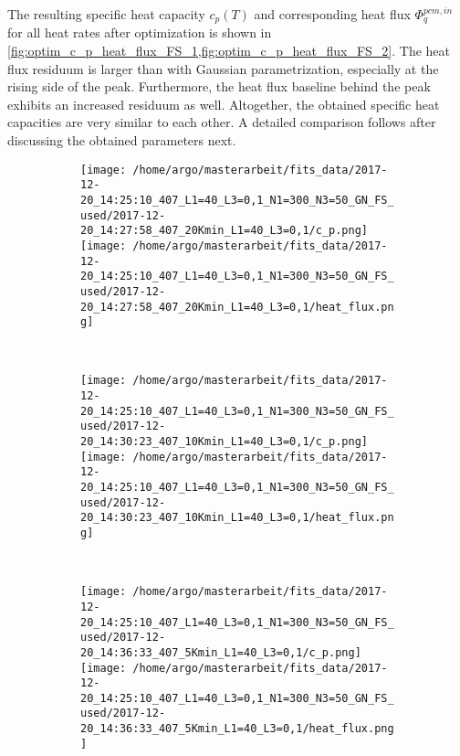 \documentclass{scrartcl}[12pt, halfparskip]
\numberwithin{equation}{section}
\numberwithin{figure}{section}
\numberwithin{table}{section}
\begin{document}
The resulting specific heat capacity $c_p(T)$ and corresponding heat flux $\varPhi_q^{pcm,in}$ for all heat rates after optimization is shown in \cref{fig:optim_c_p_heat_flux_FS_1,fig:optim_c_p_heat_flux_FS_2}. The heat flux residuum is larger than with Gaussian parametrization, especially at the rising side of the peak. Furthermore, the heat flux baseline behind the peak exhibits an increased residuum as well. Altogether, the obtained specific heat capacities are very similar to each other. A detailed comparison follows after discussing the obtained parameters next.



\begin{figure}[H]
	\begin{subfigure}{1.\textwidth}
		\texttt{[image: /home/argo/masterarbeit/fits\_data/2017-12-20\_14:25:10\_407\_L1=40\_L3=0,1\_N1=300\_N3=50\_GN\_FS\_used/2017-12-20\_14:27:58\_407\_20Kmin\_L1=40\_L3=0,1/c\_p.png]}
		\texttt{[image: /home/argo/masterarbeit/fits\_data/2017-12-20\_14:25:10\_407\_L1=40\_L3=0,1\_N1=300\_N3=50\_GN\_FS\_used/2017-12-20\_14:27:58\_407\_20Kmin\_L1=40\_L3=0,1/heat\_flux.png]}
	\end{subfigure} \\[1ex]
	
	\begin{subfigure}{1.\textwidth}
		\texttt{[image: /home/argo/masterarbeit/fits\_data/2017-12-20\_14:25:10\_407\_L1=40\_L3=0,1\_N1=300\_N3=50\_GN\_FS\_used/2017-12-20\_14:30:23\_407\_10Kmin\_L1=40\_L3=0,1/c\_p.png]}
		\texttt{[image: /home/argo/masterarbeit/fits\_data/2017-12-20\_14:25:10\_407\_L1=40\_L3=0,1\_N1=300\_N3=50\_GN\_FS\_used/2017-12-20\_14:30:23\_407\_10Kmin\_L1=40\_L3=0,1/heat\_flux.png]}
	\end{subfigure} \\[1ex]
	
	\begin{subfigure}{1.\textwidth}
		\texttt{[image: /home/argo/masterarbeit/fits\_data/2017-12-20\_14:25:10\_407\_L1=40\_L3=0,1\_N1=300\_N3=50\_GN\_FS\_used/2017-12-20\_14:36:33\_407\_5Kmin\_L1=40\_L3=0,1/c\_p.png]}
		\texttt{[image: /home/argo/masterarbeit/fits\_data/2017-12-20\_14:25:10\_407\_L1=40\_L3=0,1\_N1=300\_N3=50\_GN\_FS\_used/2017-12-20\_14:36:33\_407\_5Kmin\_L1=40\_L3=0,1/heat\_flux.png]}
	\end{subfigure} \\[1ex]
	

\end{figure}
\end{document}
